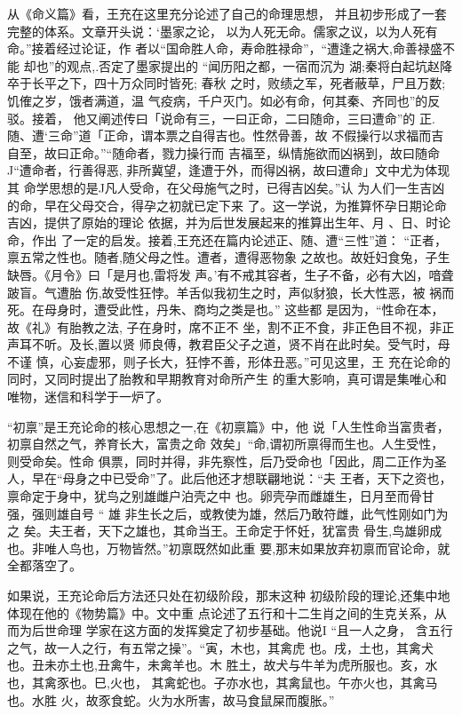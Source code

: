 从《命义篇》看，王充在这里充分论述了自己的命理思想，
并且初步形成了一套完整的体系。文章开头说：‘墨家之论，
以为人死无命。儒家之议，以为人死有命。”接着经过论证，作
者以“国命胜人命，寿命胜禄命”，“遭逢之祸大,命善禄盛不能
却也”的观点,.否定了墨家提出的 “闻历阳之都，一宿而沉为
湖;秦将白起坑赵降卒于长平之下，四十万众同时皆死; 春秋
之时，败绩之军，死者蔽草，尸且万数;饥傕之岁，饿者满道，温
气疫病，千户灭门。如必有命，何其秦、齐同也”的反驳。接着，
他又阐述传曰「说命有三，一曰正命，二曰随命，三曰遭命”的
正.随、遭‘三命”道「正命，谓本票之自得吉也。性然骨善，故
不假操行以求福而吉自至，故曰正命。”“随命者，戮力操行而
吉福至，纵情施欲而凶祸到，故曰随命J“遭命者，行善得恶,
非所冀望，逢遭于外，而得凶祸，故曰遭命」文中尤为体现其
命学思想的是J凡人受命，在父母施气之时，已得吉凶矣。”认
为人们一生吉凶的命，早在父母交合，得孕之初就已定下来
了。这一学说，为推算怀孕日期论命吉凶，提供了原始的理论
依据，并为后世发展起来的推算出生年、月 、日、时论命，作出
了一定的启发。接着,王充还在篇内论述正、随、遭“三性”道：
“正者，禀五常之性也。随者,随父母之性。遭者，遭得恶物象
之故也。故妊妇食兔，子生缺唇。《月令》曰「是月也,雷将发
声。'有不戒其容者，生子不备，必有大凶，喑聋跛盲。气遭胎
伤,故受性狂悖。羊舌似我初生之时，声似豺狼，长大性恶，被
祸而死。在母身时，遭受此性，丹朱、商均之类是也。” 这些都
是因为，“性命在本，故《礼》有胎教之法, 子在身时，席不正不
坐，割不正不食，非正色目不视，非正声耳不听。及长,置以贤
师良傅，教君臣父子之道，贤不肖在此时矣。受气时，母不谨
慎，心妄虚邪，则子长大，狂悖不善，形体丑恶。”可见这里，王
充在论命的同时，又同时提出了胎教和早期教育对命所产生
的重大影响，真可谓是集唯心和唯物，迷信和科学于一炉了。

“初禀”是王充论命的核心思想之一,在《初禀篇》中，他
说「人生性命当富贵者，初禀自然之气，养育长大，富贵之命
效矣」“命,谓初所禀得而生也。人生受性，则受命矣。性命
俱票，同时并得，非先察性，后乃受命也「因此，周二正作为圣
人，早在“母身之中已受命”了。此后他还才想联翩地说：“夫
王者，天下之资也，禀命定于身中，犹鸟之别雄雌户泊壳之中
也。卵壳孕而雌雄生，日月至而骨甘强，强则雄自号 “ 雄
非生长之后，或教使为雄，然后乃敢符雌，此气性刚如门为之
矣。夫王者，天下之雄也，其命当王。王命定于怀妊，犹富贵
骨生,鸟雄卵成也。非唯人鸟也，万物皆然。”初禀既然如此重
要,那末如果放弃初禀而官论命，就全都落空了。

如果说，王充论命后方法还只处在初级阶段，那末这种
初级阶段的理论,还集中地体现在他的《物势篇》中。文中重
点论述了五行和十二生肖之间的生克关系，从而为后世命理
学家在这方面的发挥奠定了初步基础。他说I “且一人之身，
含五行之气，故一人之行，有五常之操”。“寅，木也，其禽虎
也。戌，土也，其禽犬也。丑未亦土也,丑禽牛，未禽羊也。木
胜土，故犬与牛羊为虎所服也。亥，水也，其禽豕也。巳,火也，
其禽蛇也。子亦水也，其禽鼠也。午亦火也，其禽马也。水胜
火，故豕食蛇。火为水所害，故马食鼠屎而腹胀。”

